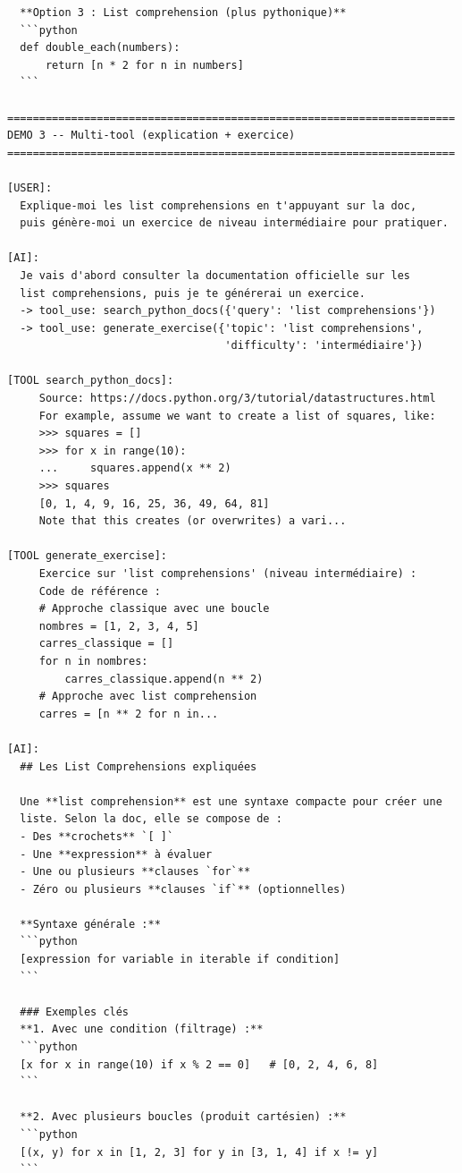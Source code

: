 \documentclass[11pt,a4paper]{article}
\begin{document}
\begin{tcolorbox}[
  colback=white,
  colframe=black!50,
  coltitle=black,
  fonttitle=\footnotesize\bfseries,
  fontupper=\footnotesize,
  title=Sortie de l'exécution,
  breakable,
]
\begin{verbatim}
  **Option 3 : List comprehension (plus pythonique)**
  ```python
  def double_each(numbers):
      return [n * 2 for n in numbers]
  ```

======================================================================
DEMO 3 -- Multi-tool (explication + exercice)
======================================================================

[USER]:
  Explique-moi les list comprehensions en t'appuyant sur la doc,
  puis génère-moi un exercice de niveau intermédiaire pour pratiquer.

[AI]:
  Je vais d'abord consulter la documentation officielle sur les
  list comprehensions, puis je te générerai un exercice.
  -> tool_use: search_python_docs({'query': 'list comprehensions'})
  -> tool_use: generate_exercise({'topic': 'list comprehensions',
                                  'difficulty': 'intermédiaire'})

[TOOL search_python_docs]:
     Source: https://docs.python.org/3/tutorial/datastructures.html
     For example, assume we want to create a list of squares, like:
     >>> squares = []
     >>> for x in range(10):
     ...     squares.append(x ** 2)
     >>> squares
     [0, 1, 4, 9, 16, 25, 36, 49, 64, 81]
     Note that this creates (or overwrites) a vari...

[TOOL generate_exercise]:
     Exercice sur 'list comprehensions' (niveau intermédiaire) :
     Code de référence :
     # Approche classique avec une boucle
     nombres = [1, 2, 3, 4, 5]
     carres_classique = []
     for n in nombres:
         carres_classique.append(n ** 2)
     # Approche avec list comprehension
     carres = [n ** 2 for n in...

[AI]:
  ## Les List Comprehensions expliquées

  Une **list comprehension** est une syntaxe compacte pour créer une
  liste. Selon la doc, elle se compose de :
  - Des **crochets** `[ ]`
  - Une **expression** à évaluer
  - Une ou plusieurs **clauses `for`**
  - Zéro ou plusieurs **clauses `if`** (optionnelles)

  **Syntaxe générale :**
  ```python
  [expression for variable in iterable if condition]
  ```

  ### Exemples clés
  **1. Avec une condition (filtrage) :**
  ```python
  [x for x in range(10) if x % 2 == 0]   # [0, 2, 4, 6, 8]
  ```

  **2. Avec plusieurs boucles (produit cartésien) :**
  ```python
  [(x, y) for x in [1, 2, 3] for y in [3, 1, 4] if x != y]
  ```


\end{verbatim}
\end{tcolorbox}
\end{document}

